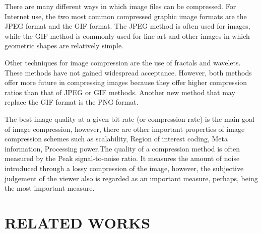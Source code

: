 \documentclass[10pt,a4paper,journal]{IEEEtran}
\begin{document}
\hspace*{2em} There are many different ways in which image files can be compressed. For
Internet use, the two most common compressed graphic image formats are the JPEG format and
the GIF format. The JPEG method is  often used for images, while the GIF method is
commonly used for line art and other images in which geometric shapes are relatively simple.

\hspace*{2em} Other techniques for image compression are the use of fractals and
wavelets. These methods have not gained widespread acceptance. However, both methods offer more future in compressing images because they offer higher compression
ratios than that of JPEG or GIF methods. Another new method that may replace the GIF format is the PNG format.

\hspace*{2em} The best image quality at a given bit-rate (or compression rate) is the main goal of image compression, however, there are other important properties of image compression schemes such as scalability, Region of interest coding, Meta information, Processing power.The quality of a compression method is often  measured by the Peak signal-to-noise ratio. It
measures the amount of noise introduced through a lossy compression of the image, however,
the subjective judgement of the viewer also is regarded as an important measure, perhaps, being
the most important measure.
\section{RELATED WORKS}
\end{document}
